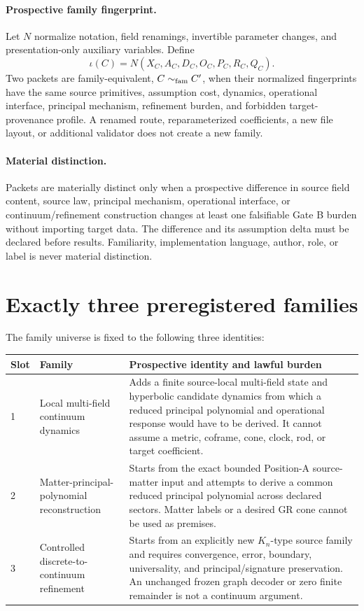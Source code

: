 \documentclass[11pt]{article}
\begin{document}
\paragraph{Prospective family fingerprint.}
Let $N$ normalize notation, field renamings, invertible parameter changes, and
presentation-only auxiliary variables. Define
\[
 \iota(C)=N(X_C,A_C,D_C,O_C,P_C,R_C,Q_C).
\]
Two packets are family-equivalent, $C\sim_{\rm fam}C'$, when their normalized
fingerprints have the same source primitives, assumption cost, dynamics,
operational interface, principal mechanism, refinement burden, and forbidden
target-provenance profile. A renamed route, reparameterized coefficients, a
new file layout, or additional validator does not create a new family.

\paragraph{Material distinction.}
Packets are materially distinct only when a prospective difference in source
field content, source law, principal mechanism, operational interface, or
continuum/refinement construction changes at least one falsifiable Gate B
burden without importing target data. The difference and its assumption delta
must be declared before results. Familiarity, implementation language, author,
role, or label is never material distinction.

\section{Exactly three preregistered families}

The family universe is fixed to the following three identities:

\begin{longtable}{p{}p{}p{}}
\toprule
Slot & Family & Prospective identity and lawful burden\\
\midrule
1 & Local multi-field continuum dynamics & Adds a finite source-local
multi-field state and hyperbolic candidate dynamics from which a reduced
principal polynomial and operational response would have to be derived. It
cannot assume a metric, coframe, cone, clock, rod, or target coefficient.\\
2 & Matter-principal-polynomial reconstruction & Starts from the exact bounded
Position-A source-matter input and attempts to derive a common reduced
principal polynomial across declared sectors. Matter labels or a desired GR
cone cannot be used as premises.\\
3 & Controlled discrete-to-continuum refinement & Starts from an explicitly
new $K_n$-type source family and requires convergence, error, boundary,
universality, and principal/signature preservation. An unchanged frozen graph
decoder or zero finite remainder is not a continuum argument.\\
\bottomrule
\end{longtable}
\end{document}
